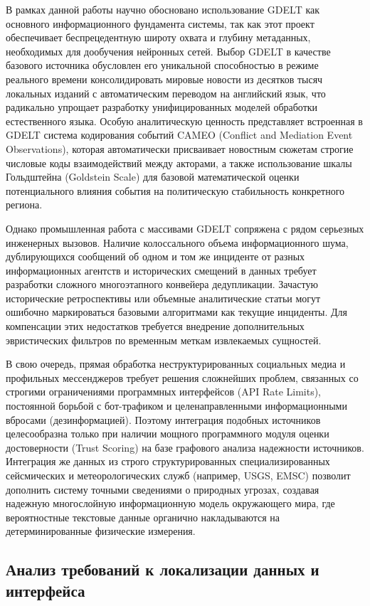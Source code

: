 В рамках данной работы научно обосновано использование GDELT как основного информационного фундамента системы, так как этот проект обеспечивает беспрецедентную широту охвата и глубину метаданных, необходимых для дообучения нейронных сетей. Выбор GDELT в качестве базового источника обусловлен его уникальной способностью в режиме реального времени консолидировать мировые новости из десятков тысяч локальных изданий с автоматическим переводом на английский язык, что радикально упрощает разработку унифицированных моделей обработки естественного языка. Особую аналитическую ценность представляет встроенная в GDELT система кодирования событий CAMEO (Conflict and Mediation Event Observations), которая автоматически присваивает новостным сюжетам строгие числовые коды взаимодействий между акторами, а также использование шкалы Гольдштейна (Goldstein Scale) для базовой математической оценки потенциального влияния события на политическую стабильность конкретного региона.

Однако промышленная работа с массивами GDELT сопряжена с рядом серьезных инженерных вызовов. Наличие колоссального объема информационного шума, дублирующихся сообщений об одном и том же инциденте от разных информационных агентств и исторических смещений в данных требует разработки сложного многоэтапного конвейера дедупликации. Зачастую исторические ретроспективы или объемные аналитические статьи могут ошибочно маркироваться базовыми алгоритмами как текущие инциденты. Для компенсации этих недостатков требуется внедрение дополнительных эвристических фильтров по временным меткам извлекаемых сущностей.

В свою очередь, прямая обработка неструктурированных социальных медиа и профильных мессенджеров требует решения сложнейших проблем, связанных со строгими ограничениями программных интерфейсов (API Rate Limits), постоянной борьбой с бот-трафиком и целенаправленными информационными вбросами (дезинформацией). Поэтому интеграция подобных источников целесообразна только при наличии мощного программного модуля оценки достоверности (Trust Scoring) на базе графового анализа надежности источников. Интеграция же данных из строго структурированных специализированных сейсмических и метеорологических служб (например, USGS, EMSC) позволит дополнить систему точными сведениями о природных угрозах, создавая надежную многослойную информационную модель окружающего мира, где вероятностные текстовые данные органично накладываются на детерминированные физические измерения.

\subsection{Анализ требований к локализации данных и интерфейса}

